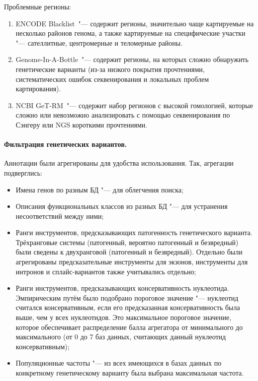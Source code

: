 \documentclass[a4paper,14pt]{extarticle}
\newcommand{\ecitep}[1]{\textenglish{\citep{#1}}}
\begin{document}
Проблемные регионы:

\begin{enumerate}
\item ENCODE Blacklist\,\ecitep{Amemiya_2019} "--- содержит регионы, значительно чаще картируемые на несколько районов генома, а также картируемые на специфические участки "--- сателлитные, центромерные и теломерные районы.
\item Genome-In-A-Bottle\,\ecitep{Zook_2014} "--- содержит регионы, на которых сложно обнаружить генетические варианты (из-за низкого покрытия прочтениями, систематических ошибок секвенирования и локальных проблем картирования).
\item NCBI GeT-RM\,\ecitep{Mandelker_2016} "--- содержит набор регионов с высокой гомологией, которые сложно или невозможно анализировать с помощью секвенирования по Сэнгеру или NGS короткими прочтениями.
\end{enumerate}


\paragraph{Фильтрация генетических вариантов.}
Аннотации были агрегированы для удобства использования.
Так, агрегации подверглись:

\begin{itemize}
	\item Имена генов по разным БД "--- для облегчения поиска;
	\item Описания функциональных классов из разных БД "--- для устранения несоответствий между ними;
	\item Ранги инструментов, предсказывающих патогенность генетического варианта.
	 Трёхранговые системы (патогенный, вероятно патогенный и безвредный) были сведены к двухранговой (патогенный и безвредный).
	 Отдельно были агрегированы предсказательные инструменты для экзонов, инструменты для интронов и сплайс-вариантов также учитывались отдельно;
	\item Ранги инструментов, предсказывающих консервативность нуклеотида.
	 Эмпирическим путём было подобрано пороговое значение  "--- нуклеотид считался консервативным, если его предсказанная консервативность была выше, чем у  всех нуклеотидов.
	 Это максимальное пороговое значение, которое обеспечивает распределение балла агрегатора от минимального до максимального (от 0 до 7 баз данных, считающих данный нуклеотид консервативным);
	\item Популяционные частоты "--- из всех имеющихся в базах данных по конкретному генетическому варианту была выбрана максимальная частота.
\end{itemize}
\end{document}
